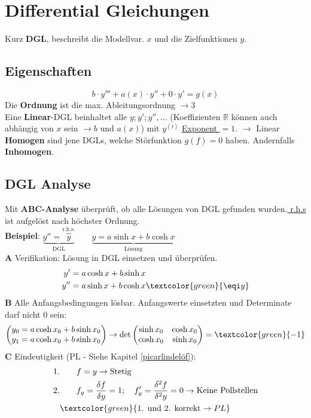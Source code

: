 \section{Differential Gleichungen}
Kurz \textbf{DGL}, beschreibt die Modellvar. $x$ und die Zielfunktionen $y$.

\subsection{Eigenschaften}
\[
b\cdot y''' + a(x) \cdot y'' + 0 \cdot y' = g(x)
\]
Die \textbf{Ordnung} ist die max. Ableitungsordnung $\to 3$ \\
Eine \textbf{Linear}-DGL beinhaltet alle $y;y';y'',...$ (Koeffizienten $\mathbb{R}$ können auch abhängig von $x$ sein $\to b \text{ und } a(x)$) mit $y^{(i)}$ \underline{Exponent $=1$}. $\to $ Linear \\
\textbf{Homogen} sind jene DGLs, welche Störfunktion $g(f) = 0$ haben. Andernfalls \textbf{Inhomogen}.


\subsection{DGL Analyse}
Mit \textbf{ABC-Analyse} überprüft, ob alle Lösungen von DGL gefunden wurden.\underline{ r.h.s} ist aufgelöst nach höchster Ordnung.\\

\noindent\textbf{Beispiel}:
$\underbrace{y'' = \overbrace{y}^\text{r.h.s.}}_\text{DGL} \qquad	\underbrace{y = a\sinh x + b\cosh x}_\text{Lösung}$\\
\textbf{A} Verifikation: Lösung in DGL einsetzen und überprüfen.
\begin{align*}
	y' &= a\cosh x + b\sinh x \\
	y'' &= a\sinh x + b\cosh x \textcolor{green}{ \eqi y}
\end{align*}
\textbf{B} Alle Anfangsbedingungen lösbar. Anfangswerte einsetzten und Determinate darf nicht $0$ sein: 
\begin{align*}
	\begin{pmatrix}
	y_0 = a\cosh x_0 + b\sinh x_0 \\
	y_1 = a\cosh x_0 + b\sinh x_0
	\end{pmatrix}
	\rightarrow
	\det\begin{pmatrix}
		\sinh x_0 & \cosh x_0 \\
		\cosh x_0 & \sinh x_0
	\end{pmatrix} = \textcolor{green}{ -1}
\end{align*}
\textbf{C} Eindeutigkeit (PL - Siehe Kapitel \ref{picarlindelöf}): \label{picarlindelöf_beispiel}
\begin{align*}
	1. &\qquad f = y \to \text{Stetig} \\
	2. &\qquad f_y = \frac{\delta f}{\delta y} = 1 ;\quad  f'_y = \frac{\delta^2 f}{\delta^2 y} = 0 \to \text{Keine Pollstellen}\\
	&\textcolor{green}{ \text{1. und 2. korrekt} \to PL}
\end{align*}

